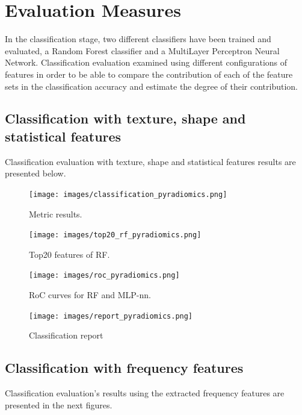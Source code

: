 \documentclass[11pt,a4paper]{report}
\begin{document}
    \section{Evaluation Measures}
		
		\par In the classification stage, two different classifiers have been trained and evaluated, a Random Forest classifier
		and a MultiLayer Perceptron Neural Network. Classification evaluation examined using different configurations of features
		in order to be able to compare the contribution of each of the feature sets in the classification accuracy and estimate
		the degree of their contribution.

	\subsection{Classification with texture, shape and statistical features}

		Classification evaluation with texture, shape and statistical features results are presented below.
	
		\begin{figure}[h]
			\centering
			\texttt{[image: images/classification\_pyradiomics.png]}
			\caption{Metric results.}
			\label{fig1:}
		\end{figure}		

		\begin{figure}[h]
			\centering
			\texttt{[image: images/top20\_rf\_pyradiomics.png]}
			\caption{Top20 features of RF.}
			\label{fig1:}
		\end{figure}		

		\begin{figure}[H]
			\centering
			\texttt{[image: images/roc\_pyradiomics.png]}
			\caption{RoC curves for RF and MLP-nn.}
			\label{fig1:}
		\end{figure}		

		\begin{figure}[H]
			\centering
			\texttt{[image: images/report\_pyradiomics.png]}
			\caption{Classification report}
			\label{fig1:}
		\end{figure}		

	\subsection{Classification with frequency features}
		

		Classification evaluation's results using the extracted frequency features are presented in the 
		next figures.
\end{document}
